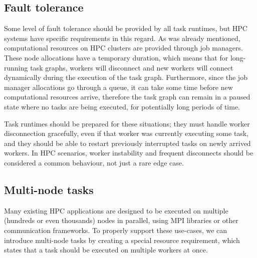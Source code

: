 \subsection{Fault tolerance}
Some level of fault tolerance should be provided by all task runtimes, but HPC systems have
specific requirements in this regard. As was already mentioned, computational resources
on HPC clusters are provided through job managers. These node allocations have
a temporary duration, which means that for long-running task graphs, workers will disconnect and
new workers will connect dynamically during the execution of the task graph. Furthermore, since
the job manager allocations go through a queue, it can take some time before new computational
resources arrive, therefore the task graph can remain in a paused state where no tasks are being
executed, for potentially long periods of time.

Task runtimes should be prepared for these situations; they must handle worker disconnection
gracefully, even if that worker was currently executing some task, and they should be able to
restart previously interrupted tasks on newly arrived workers. In HPC scenarios, worker
instability and frequent disconnects should be considered a common behaviour, not just a rare
edge case.

\subsection{Multi-node tasks}
Many existing HPC applications are designed to be executed on multiple (hundreds or even
thousands) nodes in parallel, using MPI libraries or other communication frameworks. To properly
support these use-cases, we can introduce multi-node tasks by creating a special resource
requirement, which states that a task should be executed on multiple workers at once.

